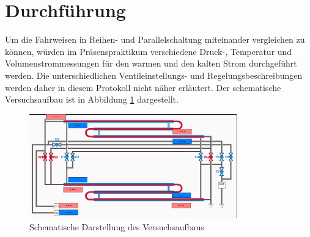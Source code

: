 
\section{Durchführung}
\label{sec:durchfuerung}

Um die Fahrweisen in Reihen- und Parallelschaltung miteinander vergleichen zu können, würden im Präsenspraktikum verschiedene Druck-, Temperatur und Volumenstrommessungen für den warmen und den kalten Strom durchgeführt werden. Die unterschiedlichen Ventileinstellungs- und Regelungsbeschreibungen werden daher in diesem Protokoll nicht näher erläutert. Der schematische Versuchsaufbau ist in Abbildung \ref{fig:schema} dargestellt.
\vspace{2mm}

\begin{figure}[h!]
	\centering
	\includegraphics[width=0.8\textwidth]{img/schema}
	\caption{Schematische Darstellung des Versuchsaufbaus}
	\label{fig:schema}
\end{figure}
\FloatBarrier
